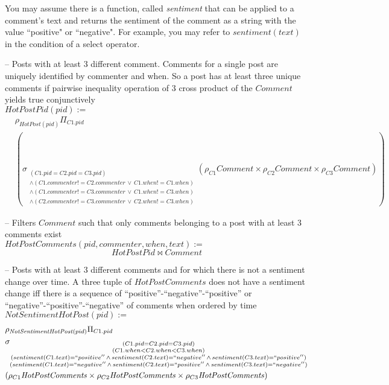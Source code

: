 \documentclass{article}
\newcommand{\var}[1]{\mathit{#1}}
\begin{document}
\begin{enumerate}
You may assume there is a function, called {\it sentiment}
that can be applied to a comment's text and 
returns the sentiment of the comment as a string with the value ``positive" or ``negative".
For example,
you may refer to $sentiment(text)$ in the condition of a select operator.



{\large 


-- Posts with at least 3 different comment. Comments for a single post are uniquely identified by commenter and when. So a post has at least three unique comments if pairwise inequality operation of 3 cross product of the $\var{Comment}$ yields true conjunctively\\ 
$\var{HotPostPid}(pid) :=$ 
\begin{align*}
    & \rho_{\var{HotPost}(pid)} \Pi_{C1.pid} \\ 
    &
    \left(
        \sigma_{
            \substack{
                (C1.pid=C2.pid=C3.pid) \\ 
                \land (C1.commenter!=C2.commenter \,\lor\, C1.when!=C1.when)\\
                \land (C1.commenter!=C3.commenter \,\lor\, C1.when!=C3.when)\\
                \land (C2.commenter!=C3.commenter \,\lor\, C2.when!=C3.when)
            }
        }
        (\rho_{C1} \var{Comment} \times \rho_{C2} \var{Comment} \times \rho_{C3} \var{Comment})
    \right)
\end{align*}

-- Filters $\var{Comment}$ such that only comments belonging to a post with at least 3 comments exist \\
$\var{HotPostComments}(pid, commenter, when, text) :=$
\[
    \var{HotPostPid} \bowtie \var{Comment}
\]

-- Posts with at least 3 different comments and for which there is not a sentiment change over time. A three tuple of $\var{HotPostComments}$ does not have a sentiment change iff there is a sequence of ``positive''-``negative''-``positive'' or ``negative''-``positive''-``negative'' of comments when ordered by time \\
$\var{NotSentimentHotPost}(pid) :=$
\begin{align*}
    &\rho_{\var{NotSentimentHotPost}(pid)} 
    \Pi_{C1.pid} \\ 
    &\sigma_{
        \substack{
            (C1.pid=C2.pid=C3.pid) \\
            (C1.when < C2.when < C3.when) \\
            (sentiment(C1.text)=``positive'' \,\land\, sentiment(C2.text)=``negative'' \,\land\, sentiment(C3.text)=``positive'') \\
            (sentiment(C1.text)=``negative'' \,\land\, sentiment(C2.text)=``positive'' \,\land\, sentiment(C3.text)=``negative'') \\ 
        }
    }\\ 
    &(\rho_{C1} \var{HotPostComments} \times \rho_{C2} \var{HotPostComments} \times \rho_{C3} \var{HotPostComments})
\end{align*}


}
\end{enumerate}
\end{document}

